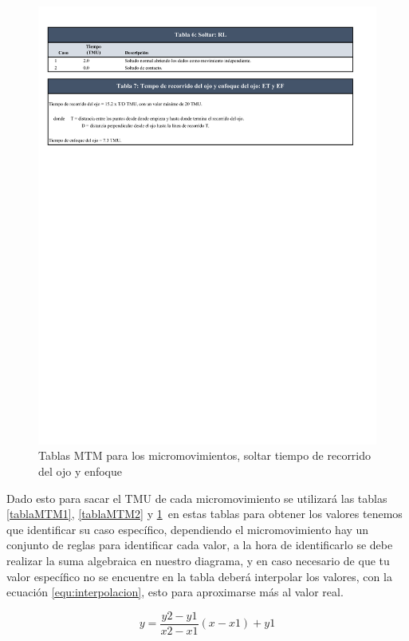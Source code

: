     
    \begin{figure}[H]
        \centering
        \includegraphics[trim = {5mm 184mm 7mm 1mm},clip,scale=0.4]{22/Img/tablasMTM3.pdf}
        \caption{Tablas MTM para los micromovimientos, soltar tiempo de recorrido del ojo y enfoque }
        \label{tablaMTM3}
    \end{figure}
    
    
    Dado esto para sacar el TMU de cada micromovimiento se utilizará las tablas \ref{tablaMTM1}, \ref{tablaMTM2} y \ref{tablaMTM3}\, en estas tablas para obtener los valores tenemos que identificar su caso específico, dependiendo el micromovimiento hay un conjunto de reglas para identificar cada valor, a la hora de identificarlo se debe realizar la suma algebraica en nuestro diagrama, y en caso necesario de que tu valor específico no se encuentre en la tabla deberá interpolar los valores, con la ecuación \ref{equ:interpolacion}, esto para aproximarse más al valor real.
    
     \begin{equation}
            \label{equ:interpolacion}
           y = \frac{y2-y1}{x2-x1}(x-x1)+y1
        \end{equation}
    
